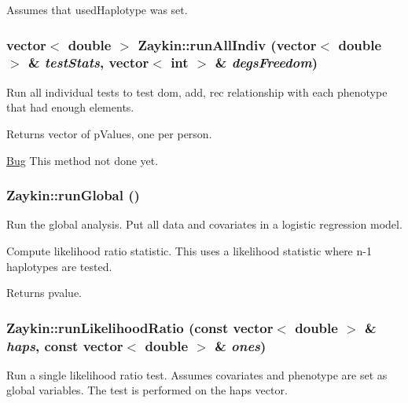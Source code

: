Assumes that usedHaplotype was set. \hypertarget{classZaykin_a5afe5c8d000df0e1dce66d4a22891623}{
\subsubsection[{runAllIndiv}]{\setlength{\rightskip}{0pt plus 5cm}vector$<$ double $>$ Zaykin::runAllIndiv (vector$<$ double $>$ \& {\em testStats}, \/  vector$<$ int $>$ \& {\em degsFreedom})}}
\label{classZaykin_a5afe5c8d000df0e1dce66d4a22891623}
Run all individual tests to test dom, add, rec relationship with each phenotype that had enough elements.

\begin{DoxyReturn}{Returns}
vector of pValues, one per person.
\end{DoxyReturn}
\begin{Desc}
\item[\hyperlink{bug__bug000003}{Bug}]This method not done yet. \end{Desc}
\hypertarget{classZaykin_a61d28f9390301515bd9a47f8e6d631fb}{
\subsubsection[{runGlobal}]{ Zaykin::runGlobal ()}}
\label{classZaykin_a61d28f9390301515bd9a47f8e6d631fb}
Run the global analysis. Put all data and covariates in a logistic regression model.

Compute likelihood ratio statistic. This uses a likelihood statistic where n-\/1 haplotypes are tested.

\begin{DoxyReturn}{Returns}
pvalue. 
\end{DoxyReturn}
\hypertarget{classZaykin_a48c7abad236fd142ec7da0e17da86356}{
\subsubsection[{runLikelihoodRatio}]{ Zaykin::runLikelihoodRatio (const vector$<$ double $>$ \& {\em haps}, \/  const vector$<$ double $>$ \& {\em ones})}}
\label{classZaykin_a48c7abad236fd142ec7da0e17da86356}
Run a single likelihood ratio test. Assumes covariates and phenotype are set as global variables. The test is performed on the haps vector.


